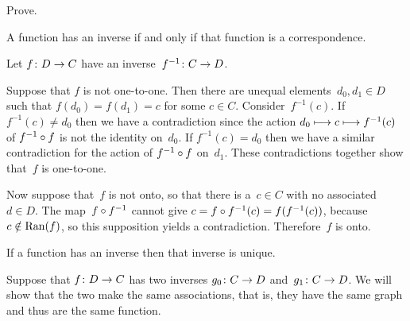 \documentclass{ibl}  %
\begin{document}
\begin{problem} \label{PropertiesOfInverses}
Prove.
\begin{exes}
\begin{exercise} 
  A function has an inverse if and only if that 
  function is a correspondence.
\end{exercise}
\begin{answer}
  Let $\mbox{$f\colon D\to C$}$ have an inverse~$\mbox{$f^{-1}\colon C\to D$}$.

  Suppose that $f$ is not one-to-one.
  Then there are unequal elements~$d_0,d_1\in D$
  such that $f(d_0)=f(d_1)=c$ for some $c\in C$.
  Consider~$f^{-1}(c)$.
  If $f^{-1}(c)\neq d_0$ then we have a contradiction since the 
  action $d_0\stackrel{}{\longmapsto}c\stackrel{}{\longmapsto}f^{-1}(c)$
  of $f^{-1}\mathbin{\circ} f$ is not the identity on~$d_0$.
  If $f^{-1}(c)=d_0$ then we have a similar contradiction for the
  action of $f^{-1}\mathbin{\circ} f$ on~$d_1$.
  These contradictions together show that~$f$ is one-to-one.
   
  Now suppose that~$f$ is not onto,
  so that there is a~$c\in C$ with no associated~$d\in D$.
  The map~$f\mathbin{\circ} f^{-1}$
  cannot give $c=f\mathbin{\circ} f^{-1}(c)=f(f^{-1}(c))$, 
  because $c\notin\operatorname{Ran}(f)$, so this supposition yields a contradiction.
  Therefore~$f$ is onto.  
\end{answer}
\begin{exercise} 
  If a function has an inverse then that inverse
  is unique.
\end{exercise}
\begin{answer}
  Suppose that $\mbox{$f\colon D\to C$}$ has two inverses $\mbox{$g_0\colon C\to D$}$
  and~$\mbox{$g_1\colon C\to D$}$.
  We will show that the two make the same associations, that is, they 
  have the same graph and
  thus are the same function.


\end{answer}
\end{exes}
\end{problem}
\end{document}
